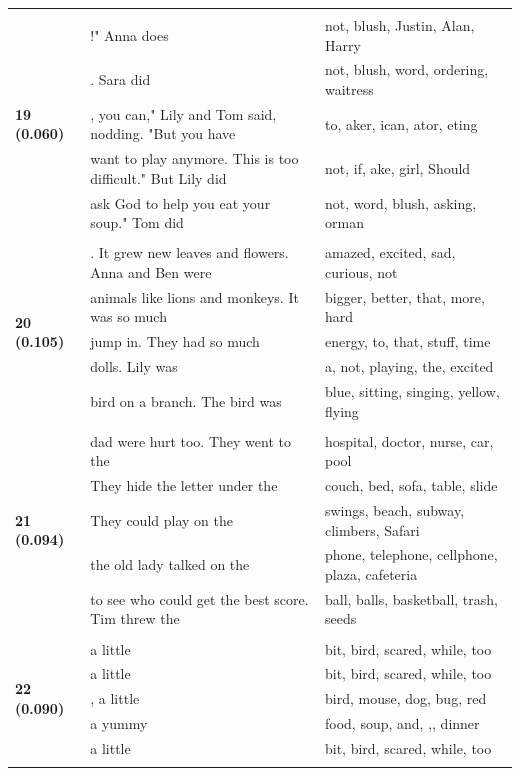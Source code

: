 \documentclass{article}
\theoremstyle{plain}
\theoremstyle{definition}
\theoremstyle{remark}
\begin{document}
\begin{longtable}{|p{}|p{}|p{}|}
& & \\
\multirow{5}{*}{\textbf{19 (0.060)}} & !"  Anna does & not,  blush,  Justin,  Alan,  Harry \\
& .  Sara did & not,  blush,  word,  ordering,  waitress \\
& , you can," Lily and Tom said, nodding. "But you have & to, aker, ican, ator, eting \\
& want to play anymore. This is too difficult." But Lily did & not,  if, ake,  girl,  Should \\
& ask God to help you eat your soup."  Tom did & not,  word,  blush,  asking, orman \\
& & \\
\multirow{5}{*}{\textbf{20 (0.105)}} & . It grew new leaves and flowers. Anna and Ben were & amazed,  excited,  sad,  curious,  not \\
& animals like lions and monkeys. It was so much & bigger,  better,  that,  more,  hard \\
& jump in. They had so much & energy,  to,  that,  stuff,  time \\
& dolls. Lily was & a,  not,  playing,  the,  excited \\
& bird on a branch. The bird was & blue,  sitting,  singing,  yellow,  flying \\
& & \\
\multirow{5}{*}{\textbf{21 (0.094)}} & dad were hurt too. They went to the & hospital,  doctor,  nurse,  car,  pool \\
& They hide the letter under the & couch,  bed,  sofa,  table,  slide \\
& They could play on the & swings,  beach,  subway,  climbers,  Safari \\
& the old lady talked on the & phone,  telephone,  cellphone,  plaza,  cafeteria \\
& to see who could get the best score.  Tim threw the & ball,  balls,  basketball,  trash,  seeds \\
& & \\
\multirow{5}{*}{\textbf{22 (0.090)}} & a little & bit,  bird,  scared,  while,  too \\
& a little & bit,  bird,  scared,  while,  too \\
& , a little & bird,  mouse,  dog,  bug,  red \\
& a yummy & food,  soup,  and, ,,  dinner \\
& a little & bit,  bird,  scared,  while,  too \\
& & \\

\end{longtable}
\end{document}
